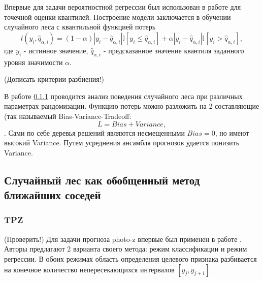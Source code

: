 \documentclass[fleqn,usenatbib]{mnras}
\begin{document}
Впервые для задачи вероятностной регрессии был использован в работе \cite{JMLR:v7:meinshausen06a} для точечной оценки квантилей. Построение модели заключается в обучении случайного леса с квантильной функцией потерь 
\begin{equation}\label{eq:quantile_loss}
    l(y_i, \hat{q}_{\alpha, i}) = (1-\alpha)|y_i - \hat{q}_{\alpha, i}|\mathbb{I}[y_i \leq \hat{q}_{\alpha, i}] + \alpha|y_i - \hat{q}_{\alpha, i}|\mathbb{I}[y_i > \hat{q}_{\alpha, i}],
\end{equation}
где $y_i$ - истинное значение, $\hat{q}_{\alpha, i}$ - предсказанное значение квантиля заданного уровня значимости $\alpha$.

(Дописать критерии разбиения!)

В работе \ref{} проводится анализ поведения случайного леса при различных параметрах рандомизации. Функцию потерь можно разложить на 2 составляющие (так называемый Bias-Variance-Tradeoff:
\begin{equation}\label{eq:bias-variance-tradeoff}
    L = Bias + Variance,
\end{equation}.
Сами по себе деревья решений являются несмещенными $Bias = 0$, но имеют высокий Variance. Путем усреднения ансамбля прогнозов удается понизить Variance.

\subsection{Случайный лес как обобщенный метод ближайших соседей}

\subsubsection{TPZ}
(Проверить!) Для задачи прогноза photo-z впервые был применен в работе \cite{bib:tpz}. Авторы предлагают 2 варианта своего метода: режим классификации и режим регрессии. В обоих режимах область определения целевого признака разбивается на конечное количество непересекающихся интервалов $[y_j, y_{j+1}]$.
\end{document}
